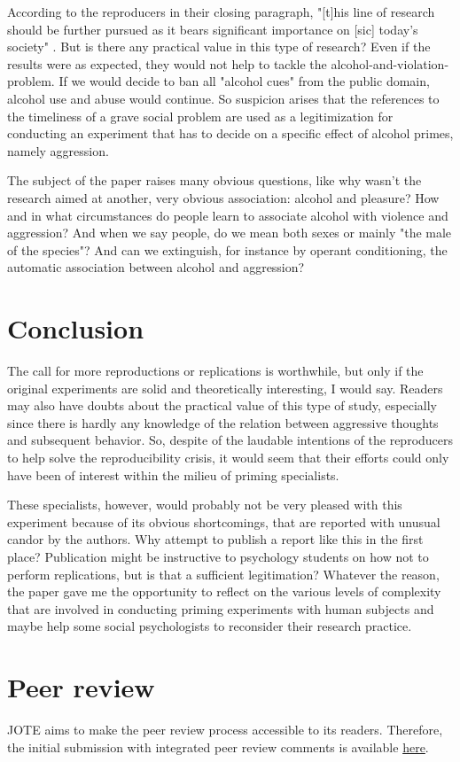 \documentclass[twocolumn, serif, authordate, reflection]{jote-article}
\begin{document}
According to the reproducers in their closing paragraph, "[t]his line of research should be further pursued as it bears significant importance on [sic] today’s society"  \parencite[p. 16]{Leboeuf2020}. But is there any practical value in this type of research? Even if the results were as expected, they would not help to tackle the alcohol-and-violation-problem. If we would decide to ban all "alcohol cues" from the public domain, alcohol use and abuse would continue. So suspicion arises that the references to the timeliness of a grave social problem are used as a legitimization for conducting an experiment that has to decide on a specific effect of alcohol primes, namely aggression.

The subject of the paper raises many obvious questions, like why wasn’t the research aimed at another, very obvious association: alcohol and pleasure? How and in what circumstances do people learn to associate alcohol with violence and aggression? And when we say people, do we mean both sexes or mainly "the male of the species"? And can we extinguish, for instance by operant conditioning, the automatic association between alcohol and aggression? 


{}
\section*{Conclusion}



The call for more reproductions or replications is worthwhile, but only if the original experiments are solid and theoretically interesting, I would say. Readers may also have doubts about the practical value of this type of study, especially since there is hardly any knowledge of the relation between aggressive thoughts and subsequent behavior. So, despite of the laudable intentions of the reproducers to help solve the reproducibility crisis, it would seem that their efforts could only have been of interest within the milieu of priming specialists.

These specialists, however, would probably not be very pleased with this experiment because of its obvious shortcomings, that are reported with unusual candor by the authors. Why attempt to publish a report like this in the first place? Publication might be instructive to psychology students on how not to perform replications, but is that a sufficient legitimation? Whatever the reason, the paper gave me the opportunity to reflect on the various levels of complexity that are involved in conducting priming experiments with human subjects and maybe help some social psychologists to reconsider their research practice.

{}
\section*{Peer review} 

JOTE aims to make the peer review process accessible to its readers. Therefore, the initial submission with integrated peer review comments is available \href{https://doi.org/10.36850/r1.pr1}{here}.

\printbibliography
\end{document}
